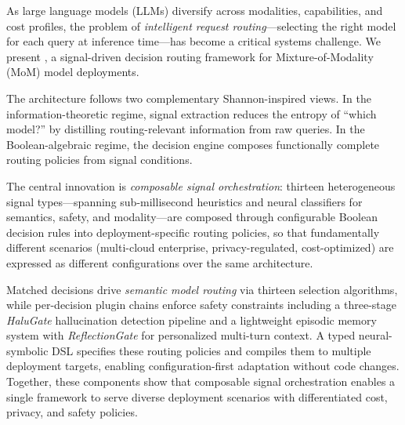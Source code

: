 As large language models (LLMs) diversify across modalities, capabilities, and cost profiles, the problem of \emph{intelligent request routing}---selecting the right model for each query at inference time---has become a critical systems challenge.
We present \textbf{\sysname{}}, a signal-driven decision routing framework for Mixture-of-Modality (MoM) model deployments.

The architecture follows two complementary Shannon-inspired views.
In the information-theoretic regime, signal extraction reduces the entropy of ``which model?'' by distilling routing-relevant information from raw queries.
In the Boolean-algebraic regime, the decision engine composes functionally complete routing policies from signal conditions.

The central innovation is \emph{composable signal orchestration}: thirteen heterogeneous signal types---spanning sub-millisecond heuristics and neural classifiers for semantics, safety, and modality---are composed through configurable Boolean decision rules into deployment-specific routing policies, so that fundamentally different scenarios (multi-cloud enterprise, privacy-regulated, cost-optimized) are expressed as different configurations over the same architecture.

Matched decisions drive \emph{semantic model routing} via thirteen selection algorithms, while per-decision plugin chains enforce safety constraints including a three-stage \emph{HaluGate} hallucination detection pipeline and a lightweight episodic memory system with \emph{ReflectionGate} for personalized multi-turn context.
A typed neural-symbolic DSL specifies these routing policies and compiles them to multiple deployment targets, enabling configuration-first adaptation without code changes.
Together, these components show that composable signal orchestration enables a single framework to serve diverse deployment scenarios with differentiated cost, privacy, and safety policies.
